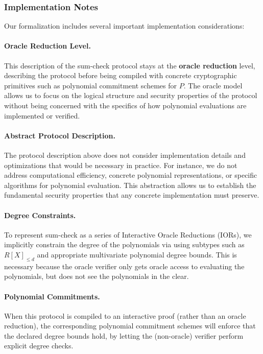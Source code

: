 \subsubsection{Implementation Notes}

Our formalization includes several important implementation considerations:

\paragraph{Oracle Reduction Level.} This description of the sum-check protocol stays at the \textbf{oracle reduction} level, describing the protocol before being compiled with concrete cryptographic primitives such as polynomial commitment schemes for $P$. The oracle model allows us to focus on the logical structure and security properties of the protocol without being concerned with the specifics of how polynomial evaluations are implemented or verified.

\paragraph{Abstract Protocol Description.} The protocol description above does not consider implementation details and optimizations that would be necessary in practice. For instance, we do not address computational efficiency, concrete polynomial representations, or specific algorithms for polynomial evaluation. This abstraction allows us to establish the fundamental security properties that any concrete implementation must preserve.

\paragraph{Degree Constraints.} To represent sum-check as a series of Interactive Oracle Reductions (IORs), we implicitly constrain the degree of the polynomials via using subtypes such as $R[X]_{\leq d}$ and appropriate multivariate polynomial degree bounds. This is necessary because the oracle verifier only gets oracle access to evaluating the polynomials, but does not see the polynomials in the clear.

\paragraph{Polynomial Commitments.} When this protocol is compiled to an interactive proof (rather than an oracle reduction), the corresponding polynomial commitment schemes will enforce that the declared degree bounds hold, by letting the (non-oracle) verifier perform explicit degree checks.

